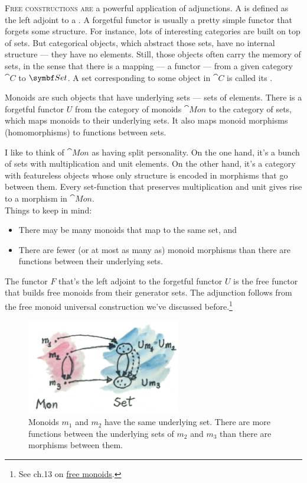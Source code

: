 
\lettrine[lhang=0.17]{F}{ree constructions are} a powerful application of adjunctions. A
 is defined as the left adjoint to a . A forgetful functor is usually a pretty simple functor that
forgets some structure. For instance, lots of interesting categories are
built on top of sets. But categorical objects, which abstract those
sets, have no internal structure --- they have no elements. Still, those
objects often carry the memory of sets, in the sense that there is a
mapping --- a functor --- from a given category $\cat{C}$ to
$\Set$. A set corresponding to some object in $\cat{C}$ is called
its .

Monoids are such objects that have underlying sets --- sets of elements.
There is a forgetful functor $U$ from the category of monoids
$\cat{Mon}$ to the category of sets, which maps monoids to their
underlying sets. It also maps monoid morphisms (homomorphisms) to
functions between sets.

I like to think of $\cat{Mon}$ as having split personality. On the one
hand, it's a bunch of sets with multiplication and unit elements. On the
other hand, it's a category with featureless objects whose only
structure is encoded in morphisms that go between them. Every
set-function that preserves multiplication and unit gives rise to a
morphism in $\cat{Mon}$.\\
\newline
Things to keep in mind:

\begin{itemize}
  \tightlist
  \item
        There may be many monoids that map to the same set, and
  \item
        There are fewer (or at most as many as) monoid morphisms than there
        are functions between their underlying sets.
\end{itemize}

\noindent
The functor $F$ that's the left adjoint to the forgetful functor
$U$ is the free functor that builds free monoids from their
generator sets. The adjunction follows from the free monoid
universal construction we've discussed before.\footnote{See ch.13 on
  \hyperref[free-monoids]{free monoids}.}

\begin{figure}[H]
  \centering
  \includegraphics[width=0.6\textwidth]{images/forgetful.jpg}
  \caption{Monoids $m_1$ and $m_2$ have the same
    underlying set. There are more functions between the underlying sets of
    $m_2$ and $m_3$ than there are morphisms
    between them.}
\end{figure}

